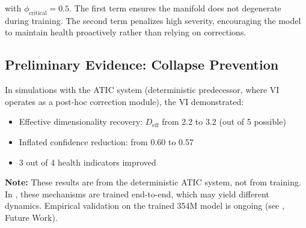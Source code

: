 with $\phi_{\text{critical}} = 0.5$. The first term ensures the manifold
does not degenerate during training. The second term penalizes high
severity, encouraging the model to maintain health proactively rather
than relying on corrections.

\subsection{Preliminary Evidence: Collapse Prevention}

In simulations with the ATIC system (deterministic predecessor, where VI
operates as a post-hoc correction module), the VI demonstrated:

\begin{itemize}
    \item Effective dimensionality recovery: $D_{\text{eff}}$
    from 2.2 to 3.2 (out of 5 possible)
    \item Inflated confidence reduction: from 0.60 to 0.57
    \item 3 out of 4 health indicators improved
\end{itemize}

\textbf{Note:} These results are from the deterministic ATIC system, not
from \aletheion{} training. In \aletheion{}, these mechanisms are trained
end-to-end, which may yield different dynamics. Empirical validation on
the trained 354M model is ongoing (see , Future Work).
